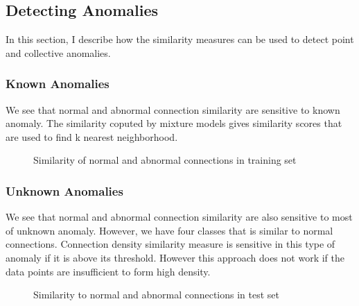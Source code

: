 \subsection{Detecting Anomalies}
\label{subsec:detectinganomalies}
In this section, I describe how the similarity measures can be used to detect point and collective anomalies.

\subsubsection{Known Anomalies}
We see that normal and abnormal connection similarity are sensitive to known anomaly. The similarity coputed by mixture models gives similarity scores that are used to find k nearest neighborhood.
\begin{figure}[htb2]
\begin{center}
\end{center}
\caption{Similarity of normal and abnormal connections in training set} %
\label{fig:refSingleRobot1}
\end{figure}

\subsubsection{Unknown Anomalies}
We see that normal and abnormal connection similarity are also sensitive to most of unknown anomaly. However, we have four classes that is similar to normal connections. Connection density similarity measure is sensitive in this type of anomaly if it is above its threshold. However this approach does not work if the data points are insufficient to form high density.

\begin{figure}[htb2]
\begin{center}
\end{center}
\caption{Similarity to normal and abnormal connections in test set} %
\label{fig:refSingleRobot1}
\end{figure}

